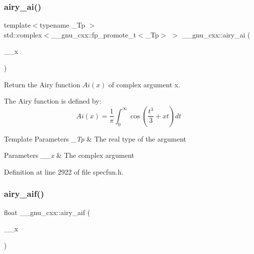 \mbox{\label{group__mathsf__gnu_gacf37e6c9f186ade270b476c8e5826fb9}} 
\subsubsection{\texorpdfstring{airy\+\_\+ai()}{airy\_ai()}\hspace{0.1cm}{\footnotesize\ttfamily [2/2]}}
{\footnotesize\ttfamily template$<$typename \+\_\+\+Tp $>$ \\
std\+::complex$<$\+\_\+\+\_\+gnu\+\_\+cxx\+::fp\+\_\+promote\+\_\+t$<$\+\_\+\+Tp$>$ $>$ \+\_\+\+\_\+gnu\+\_\+cxx\+::airy\+\_\+ai (\begin{DoxyParamCaption}\item[{std\+::complex$<$ \+\_\+\+Tp $>$}]{\+\_\+\+\_\+x }\end{DoxyParamCaption})\hspace{0.3cm}{\ttfamily [inline]}}

Return the Airy function $ Ai(x) $ of complex argument {\ttfamily x}.

The Airy function is defined by\+: \[ Ai(x) = \frac{1}{\pi}\int_0^\infty \cos \left(\frac{t^3}{3} + xt \right)dt \]


\begin{DoxyTemplParams}{Template Parameters}
{\em \+\_\+\+Tp} & The real type of the argument \\
\hline
\end{DoxyTemplParams}

\begin{DoxyParams}{Parameters}
{\em \+\_\+\+\_\+x} & The complex argument \\
\hline
\end{DoxyParams}


Definition at line 2922 of file specfun.\+h.

\mbox{\label{group__mathsf__gnu_gaf317ba724c44b3a8271fe341d9870173}} 
\subsubsection{\texorpdfstring{airy\+\_\+aif()}{airy\_aif()}}
{\footnotesize\ttfamily float \+\_\+\+\_\+gnu\+\_\+cxx\+::airy\+\_\+aif (\begin{DoxyParamCaption}\item[{float}]{\+\_\+\+\_\+x }\end{DoxyParamCaption})\hspace{0.3cm}{\ttfamily [inline]}}

